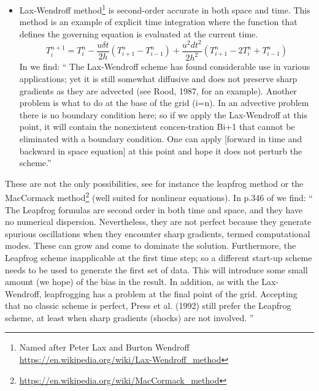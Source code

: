 \begin{itemize}
\item {\color{olive} Lax-Wendroff method}\footnote{Named after Peter Lax 
and Burton Wendroff \url{https://en.wikipedia.org/wiki/Lax-Wendroff_method}} \cite{hoch}
is second-order accurate in both space and time. 
This method is an example of explicit time integration where the function that defines 
the governing equation is evaluated at the current time. 
\[
T^{n+1}_i = T_i^n - \frac{u \delta t}{2 h} (T_{i+1}^n-T_{i-1}^n)
+ \frac{u^2 dt^2}{2 h^2} (T_{i+1}^n-2 T_i^n+T_{i-1}^n)
\]
In \cite{boudreau} we find:
``
The Lax-Wendroff scheme has found considerable use in various applications; yet it
is still somewhat diffusive and does not preserve sharp gradients as they are advected
(see Rood, 1987, for an example). Another problem is what to do at the base of the
grid (i=n). In an advective problem there is no boundary condition here; so if we
apply the Lax-Wendroff at this point, it will contain the nonexistent concen-tration
Bi+1 that cannot be eliminated with a boundary condition. One can apply [forward in time and
backward in space equation] at this point and hope it does not perturb the scheme.''







\end{itemize}
These are not the only possibilities, see for instance 
the {\color{olive} leapfrog method} or the
MacCormack method\footnote{\url{https://en.wikipedia.org/wiki/MacCormack_method}} (well suited for nonlinear equations).  
In p.346 of \cite{boudreau} we find:
``
The Leapfrog formulas are second order in both time and space, and they have no
numerical dispersion. Nevertheless, they are not perfect because they generate
spurious oscillations when they encounter sharp gradients, termed computational
modes. These can grow and come to dominate the solution. Furthermore, the
Leapfrog scheme inapplicable at the first time step; so a different start-up scheme
needs to be used to generate the first set of data. This will introduce some small
amount (we hope) of the bias in the result. In addition, as with the Lax-Wendroff,
leapfrogging has a problem at the final point of the grid. Accepting that no classic
scheme is perfect, Press et al. (1992) still prefer the Leapfrog scheme, at least when
sharp gradients (shocks) are not involved.
''




